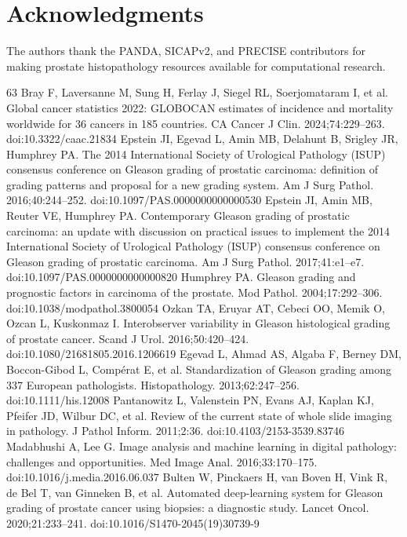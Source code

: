 \documentclass[10pt,letterpaper]{article}
\begin{document}
\section*{Acknowledgments}
The authors thank the PANDA, SICAPv2, and PRECISE contributors for making prostate histopathology resources available for computational research.

\begin{thebibliography}{63}
 Bray F, Laversanne M, Sung H, Ferlay J, Siegel RL, Soerjomataram I, et al. Global cancer statistics 2022: GLOBOCAN estimates of incidence and mortality worldwide for 36 cancers in 185 countries. CA Cancer J Clin. 2024;74:229--263. doi:10.3322/caac.21834
 Epstein JI, Egevad L, Amin MB, Delahunt B, Srigley JR, Humphrey PA. The 2014 International Society of Urological Pathology (ISUP) consensus conference on Gleason grading of prostatic carcinoma: definition of grading patterns and proposal for a new grading system. Am J Surg Pathol. 2016;40:244--252. doi:10.1097/PAS.0000000000000530
 Epstein JI, Amin MB, Reuter VE, Humphrey PA. Contemporary Gleason grading of prostatic carcinoma: an update with discussion on practical issues to implement the 2014 International Society of Urological Pathology (ISUP) consensus conference on Gleason grading of prostatic carcinoma. Am J Surg Pathol. 2017;41:e1--e7. doi:10.1097/PAS.0000000000000820
 Humphrey PA. Gleason grading and prognostic factors in carcinoma of the prostate. Mod Pathol. 2004;17:292--306. doi:10.1038/modpathol.3800054
 Ozkan TA, Eruyar AT, Cebeci OO, Memik O, Ozcan L, Kuskonmaz I. Interobserver variability in Gleason histological grading of prostate cancer. Scand J Urol. 2016;50:420--424. doi:10.1080/21681805.2016.1206619
 Egevad L, Ahmad AS, Algaba F, Berney DM, Boccon-Gibod L, Comp\'erat E, et al. Standardization of Gleason grading among 337 European pathologists. Histopathology. 2013;62:247--256. doi:10.1111/his.12008
 Pantanowitz L, Valenstein PN, Evans AJ, Kaplan KJ, Pfeifer JD, Wilbur DC, et al. Review of the current state of whole slide imaging in pathology. J Pathol Inform. 2011;2:36. doi:10.4103/2153-3539.83746
 Madabhushi A, Lee G. Image analysis and machine learning in digital pathology: challenges and opportunities. Med Image Anal. 2016;33:170--175. doi:10.1016/j.media.2016.06.037
 Bulten W, Pinckaers H, van Boven H, Vink R, de Bel T, van Ginneken B, et al. Automated deep-learning system for Gleason grading of prostate cancer using biopsies: a diagnostic study. Lancet Oncol. 2020;21:233--241. doi:10.1016/S1470-2045(19)30739-9

\end{thebibliography}
\end{document}
